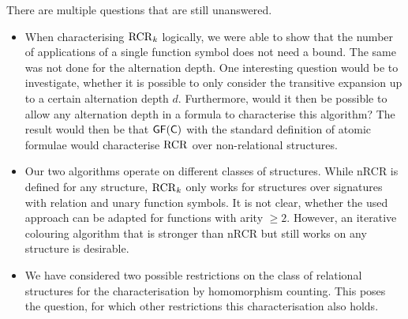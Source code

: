 There are multiple questions that are still unanswered.
\begin{itemize}
	\item When characterising $\operatorname{RCR}_k$ logically, we were able to show that the number of applications of a single function symbol does not need a bound.
	The same was not done for the alternation depth.
	One interesting question would be to investigate, whether it is possible to only consider the transitive expansion up to a certain alternation depth $d$.
	Furthermore, would it then be possible to allow any alternation depth in a formula to characterise this algorithm?
	The result would then be that $\mathsf{GF}(\mathsf{C})$ with the standard definition of atomic formulae would characterise $\operatorname{RCR}$ over non-relational structures.
	\item Our two algorithms operate on different classes of structures.
	While nRCR is defined for any structure, $\operatorname{RCR}_k$ only works for structures over signatures with relation and unary function symbols.
	It is not clear, whether the used approach can be adapted for functions with arity $\geq 2$.
	However, an iterative colouring algorithm that is stronger than nRCR but still works on any structure is desirable.
	\item We have considered two possible restrictions on the class of relational structures for the characterisation by homomorphism counting.
	This poses the question, for which other restrictions this characterisation also holds.
\end{itemize}

